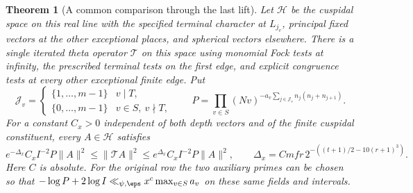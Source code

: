 \documentclass[a4paper,11pt]{article}
\newtheorem{theorem}[proposition]{Theorem}
\theoremstyle{definition}
\theoremstyle{remark}
\numberwithin{equation}{section}
\begin{document}
\begin{theorem}[A common comparison through the last lift]
\label{thm:common178}
Let \(\mathcal H\) be the cuspidal space on this real line
with the specified terminal character at \(L_{j_v}\),
principal fixed vectors at the other exceptional places,
and spherical vectors elsewhere. There is a single iterated
theta operator \(\mathcal T\) on this space using monomial
Fock tests at infinity, the prescribed terminal tests on the
first edge, and explicit congruence tests at every other
exceptional finite edge. Put
\[
 \mathcal J_v=
 \begin{cases}\{1,\ldots,m-1\}&v\mid T,\\
               \{0,\ldots,m-1\}&v\in S,\ v\nmid T,
 \end{cases}
 \qquad P=\prod_{v\in S}(Nv)^{-a_v
                  \sum_{j\in\mathcal J_v}n_j(n_j+n_{j+1})}.
\]
For a constant \(C_x>0\) independent of both depth vectors
and of the finite cuspidal constituent, every \(A\in\mathcal H\)
satisfies
\[
 e^{-\Delta_x} C_x I^{-2}P\|A\|^2
 \le \|\mathcal TA\|^2 \le e^{\Delta_x} C_x I^{-2}P\|A\|^2,
 \qquad
 \Delta_x=Cmfr\,2^{-((t+1)/2-10(r+1)^3)}.
\]
Here \(C\) is absolute. For the original row the two auxiliary
primes can be chosen so that
\(-\log P+2\log I\ll_{\psi,\eps} x^c\max_{v\in S}a_v\)
on these same fields and intervals.
\end{theorem}
\end{document}

